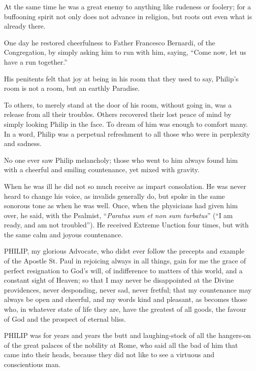 At the same time he was a great
enemy to anything like rudeness or foolery; for a buffooning spirit not
only does not advance in religion, but roots out even what is already
there.

One day he restored cheerfulness
to Father Francesco Bernardi, of the Congregation, by simply asking him
to run with him, saying, ``Come now, let us have a run together.''

His penitents felt that joy at
being in his room that they used to say, Philip's room is not a room,
but an earthly Paradise.

To others, to merely stand at
the door of his room, without going in, was a release from all their
troubles. Others recovered their lost peace of mind by simply looking
Philip in the face. To dream of him was enough to comfort many. In a
word, Philip was a perpetual refreshment to all those who were in
perplexity and sadness.

No one ever saw Philip
melancholy; those who went to him always found him with a cheerful and
smiling countenance, yet mixed with gravity.

When he was ill he did not so
much receive as impart consolation. He was never heard to change his
voice, as invalids generally do, but spoke in the same sonorous tone as
when he was well. Once, when the physicians had given him over, he said,
with the Psalmist, ``\emph{Paratus sum et non sum turbatus}'' (``I am
ready, and am not troubled''). He received Extreme Unction four times,
but with the same calm and joyous countenance.


PHILIP, my glorious
Advocate, who didst ever follow the precepts and example of the Apostle
St. Paul in rejoicing always in all things, gain for me the grace
of perfect resignation to God's will, of indifference to matters of this
world, and a constant sight of Heaven; so that I may never be
disappointed at the Divine providences, never desponding, never sad,
never fretful; that my countenance may always be open and cheerful, and
my words kind and pleasant, as becomes those who, in whatever state of
life they are, have the greatest of all goods, the favour of God and the
prospect of eternal bliss.



PHILIP was for years
and years the butt and laughing-stock of all the hangers-on of the great
palaces of the nobility at Rome, who said all the bad of him that came
into their heads, because they did not like to see a virtuous and
conscientious man.

